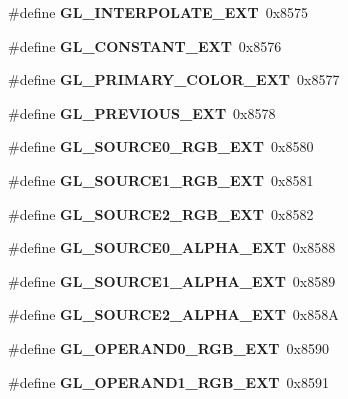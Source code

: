 \begin{DoxyCompactItemize}
\item 
\#define {\bfseries G\+L\+\_\+\+I\+N\+T\+E\+R\+P\+O\+L\+A\+T\+E\+\_\+\+E\+X\+T}~0x8575\label{_s_d_l__opengl_8h_addafb06c9b38577b00ec7fc1847afa8a}

\item 
\#define {\bfseries G\+L\+\_\+\+C\+O\+N\+S\+T\+A\+N\+T\+\_\+\+E\+X\+T}~0x8576\label{_s_d_l__opengl_8h_a2237d910fdf7b66e9bd3167b9f90f516}

\item 
\#define {\bfseries G\+L\+\_\+\+P\+R\+I\+M\+A\+R\+Y\+\_\+\+C\+O\+L\+O\+R\+\_\+\+E\+X\+T}~0x8577\label{_s_d_l__opengl_8h_a6349861278824b305ef32f02980bb577}

\item 
\#define {\bfseries G\+L\+\_\+\+P\+R\+E\+V\+I\+O\+U\+S\+\_\+\+E\+X\+T}~0x8578\label{_s_d_l__opengl_8h_ade5ff6e748965ebce4f219069fcf02ed}

\item 
\#define {\bfseries G\+L\+\_\+\+S\+O\+U\+R\+C\+E0\+\_\+\+R\+G\+B\+\_\+\+E\+X\+T}~0x8580\label{_s_d_l__opengl_8h_a224182f913d011209adfbb753608ec65}

\item 
\#define {\bfseries G\+L\+\_\+\+S\+O\+U\+R\+C\+E1\+\_\+\+R\+G\+B\+\_\+\+E\+X\+T}~0x8581\label{_s_d_l__opengl_8h_a12c782c4048426e0604c10717a39b545}

\item 
\#define {\bfseries G\+L\+\_\+\+S\+O\+U\+R\+C\+E2\+\_\+\+R\+G\+B\+\_\+\+E\+X\+T}~0x8582\label{_s_d_l__opengl_8h_aae17331f4e7c3cb591633d89bef1de0d}

\item 
\#define {\bfseries G\+L\+\_\+\+S\+O\+U\+R\+C\+E0\+\_\+\+A\+L\+P\+H\+A\+\_\+\+E\+X\+T}~0x8588\label{_s_d_l__opengl_8h_a641340cd5bdf7ef928abe4f61573fb5f}

\item 
\#define {\bfseries G\+L\+\_\+\+S\+O\+U\+R\+C\+E1\+\_\+\+A\+L\+P\+H\+A\+\_\+\+E\+X\+T}~0x8589\label{_s_d_l__opengl_8h_a0530a1e623d0eca15ebc550a15655de4}

\item 
\#define {\bfseries G\+L\+\_\+\+S\+O\+U\+R\+C\+E2\+\_\+\+A\+L\+P\+H\+A\+\_\+\+E\+X\+T}~0x858\+A\label{_s_d_l__opengl_8h_ab9cc98399f92da05d5cb2f5b1296d18e}

\item 
\#define {\bfseries G\+L\+\_\+\+O\+P\+E\+R\+A\+N\+D0\+\_\+\+R\+G\+B\+\_\+\+E\+X\+T}~0x8590\label{_s_d_l__opengl_8h_ae1340b36e53e8944966733f91821482c}

\item 
\#define {\bfseries G\+L\+\_\+\+O\+P\+E\+R\+A\+N\+D1\+\_\+\+R\+G\+B\+\_\+\+E\+X\+T}~0x8591\label{_s_d_l__opengl_8h_a4536bac66ad5f01113d5c844a03b9e11}


\end{DoxyCompactItemize}
